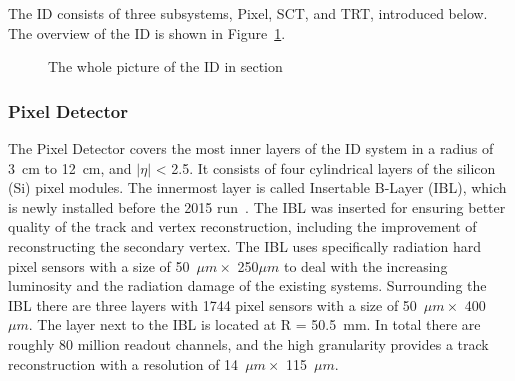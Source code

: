 The ID consists of three subsystems, Pixel, SCT, and TRT, introduced below.
The overview of the ID is shown in Figure~\ref{fig:ID}.
\begin{figure}[tbp]
\begin{center}
\caption{
The whole picture of the ID in section
}
\label{fig:ID}
\end{center}
\end{figure}

\subsubsection{Pixel Detector}
The Pixel Detector covers the most inner layers of the ID system in a radius of 3~cm to 12~cm, and $|\eta|$ < 2.5. 
It consists of four cylindrical layers of the silicon (Si) pixel modules.
The innermost layer is called Insertable B-Layer (IBL), which is newly installed before the 2015 run~\cite{PIX-2018-001}. 
The IBL was inserted for ensuring better quality of the track and vertex reconstruction, including the improvement of reconstructing the secondary vertex.
The IBL uses specifically radiation hard pixel sensors with a size of 50~$\mu m \times$ 250$\mu m$ to deal with the increasing luminosity and the radiation damage of the existing systems. 
Surrounding the IBL there are three layers with 1744 pixel sensors with a size of 50~$\mu m \times$ 400~$\mu m$. 
The layer next to the IBL is located at R = 50.5~mm. In total there are roughly 80 million readout channels, and the high granularity provides a track reconstruction with a resolution of 14~$\mu m  \times$ 115~$\mu m$.

